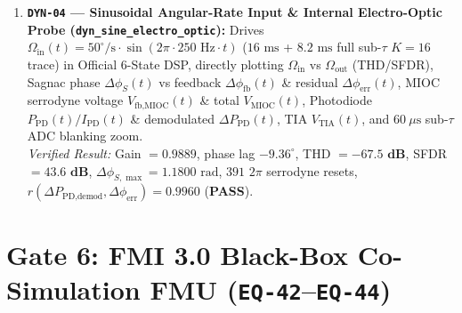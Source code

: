 \documentclass[11pt,a4paper]{article}
\begin{document}
\begin{enumerate}
    \item \textbf{\texttt{DYN-04} --- Sinusoidal Angular-Rate Input \& Internal Electro-Optic Probe (\texttt{dyn\_sine\_electro\_optic}):}
    Drives $\Omega_{\text{in}}(t) = 50^\circ/\text{s}\cdot\sin(2\pi\cdot 250\text{ Hz}\cdot t)$ ($16\text{ ms}$ + $8.2\text{ ms}$ full sub-$\tau$ $K=16$ trace) in Official 6-State DSP, directly plotting $\Omega_{\text{in}}$ vs $\Omega_{\text{out}}$ (THD/SFDR), Sagnac phase $\Delta\phi_S(t)$ vs feedback $\Delta\phi_{\text{fb}}(t)$ \& residual $\Delta\phi_{\text{err}}(t)$, MIOC serrodyne voltage $V_{\text{fb,MIOC}}(t)$ \& total $V_{\text{MIOC}}(t)$, Photodiode $P_{\text{PD}}(t)/I_{\text{PD}}(t)$ \& demodulated $\Delta P_{\text{PD}}(t)$, TIA $V_{\text{TIA}}(t)$, and $60\ \mu\text{s}$ sub-$\tau$ ADC blanking zoom.\\
    \emph{Verified Result:} Gain $= 0.9889$, phase lag $-9.36^\circ$, THD $= \mathbf{-67.5\text{ dB}}$, SFDR $= \mathbf{43.6\text{ dB}}$, $\Delta\phi_{S,\max} = 1.1800\text{ rad}$, $391$ $2\pi$ serrodyne resets, $r(\Delta P_{\text{PD,demod}}, \Delta\phi_{\text{err}}) = \mathbf{0.9960}$ (\textbf{PASS}).
\end{enumerate}

\section{Gate 6: FMI 3.0 Black-Box Co-Simulation FMU (\texttt{EQ-42}--\texttt{EQ-44})}
\end{document}
